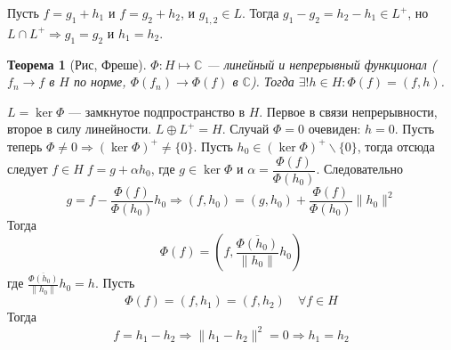 \documentclass[12pt]{article}
\begin{document}
Пусть $f = g_1 + h_1$ и $f = g_2 + h_2$, и $g_{1,2} \in L$.
Тогда $g_1 - g_2 = h_2 - h_1 \in L^+$, но $L \cap L^+\Rightarrow g_1 = g_2$ и $h_1 = h_2$.

\newtheorem{Th3}{Теорема}
\begin{Th3}[Рис, Фреше]
    $\Phi:H \mapsto \mathbb C$ --- линейный и непрерывный функционал ($f_n \to f$ в $H$ по норме, $\Phi(f_n) \to \Phi(f)$ в $\mathbb C$).
    Тогда $\exists! h \in H\colon \Phi(f) = (f,h)$.
\end{Th3}
\begin{Proof}
    $L = \ker \Phi$ --- замкнутое подпространство в $H$.
    Первое в связи непрерывности, второе в силу линейности.
    $L \oplus L^+ = H$.
    Случай $\Phi = 0$ очевиден: $h = 0$.
    Пусть теперь $\Phi \ne 0\Rightarrow (\ker\Phi)^+ \ne \{0\}$.
    Пусть $h_0 \in (\ker\Phi)^+\backslash\{0\}$, тогда отсюда следует $f \in H\;f = g +\alpha h_0$,
    где $g \in \ker \Phi$ и $\alpha = \dfrac{\Phi(f)}{\Phi(h_0)}$.
    Следовательно
    $$
    g = f - \frac{\Phi(f)}{\Phi(h_0)}h_0\Rightarrow (f,h_0) = (g, h_0) + \frac{\Phi(f)}{\Phi(h_0)}\|h_0\|^2
    $$
    Тогда
    $$
    \Phi(f) = (f, \frac{\overline{\Phi(h_0)}}{\|h_0\|}h_0)
    $$
    где $\frac{\overline{\Phi(h_0)}}{\|h_0\|}h_0 = h$.
    Пусть
    $$
    \Phi(f) = (f, h_1) = (f, h_2)\quad\forall f\in H
    $$
    Тогда
    $$
    f = h_1 - h_2\Rightarrow \|h_1 - h_2\|^2 = 0\Rightarrow h_1 = h_2
    $$
\end{Proof}
\end{document}
